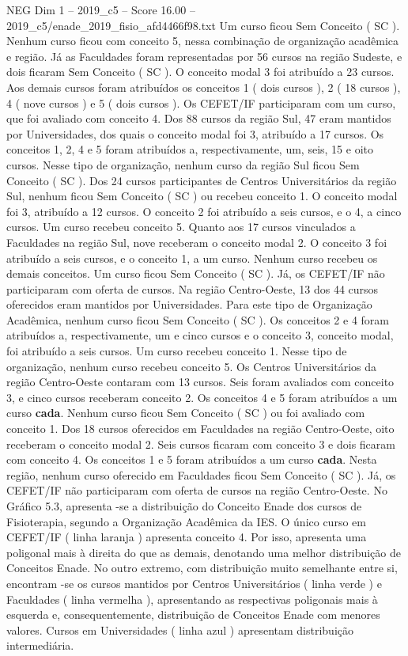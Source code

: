\begin{textsample}{NEG Dim 1 – 2019\_c5 – Score 16.00 – 2019\_c5/enade\_2019\_fisio\_afd4466f98.txt}
Um curso ficou Sem Conceito ( SC ).
Nenhum curso ficou com conceito 5, nessa combinação de organização acadêmica e região.
Já as Faculdades foram representadas por 56 cursos na região Sudeste, e dois ficaram Sem Conceito ( SC ).
O conceito modal 3 foi atribuído a 23 cursos.
Aos demais cursos foram atribuídos os conceitos 1 ( dois cursos ), 2 ( 18 cursos ), 4 ( nove cursos ) e 5 ( dois cursos ).
Os CEFET/IF participaram com um curso, que foi avaliado com conceito 4.
Dos 88 cursos da região Sul, 47 eram mantidos por Universidades, dos quais o conceito modal foi 3, atribuído a 17 cursos.
Os conceitos 1, 2, 4 e 5 foram atribuídos a, respectivamente, um, seis, 15 e oito cursos.
Nesse tipo de organização, nenhum curso da região Sul ficou Sem Conceito ( SC ).
Dos 24 cursos participantes de Centros Universitários da região Sul, nenhum ficou Sem Conceito ( SC ) ou recebeu conceito 1.
O conceito modal foi 3, atribuído a 12 cursos.
O conceito 2 foi atribuído a seis cursos, e o 4, a cinco cursos.
Um curso recebeu conceito 5.
Quanto aos 17 cursos vinculados a Faculdades na região Sul, nove receberam o conceito modal 2.
O conceito 3 foi atribuído a seis cursos, e o conceito 1, a um curso.
Nenhum curso recebeu os demais conceitos.
Um curso ficou Sem Conceito ( SC ).
Já, os CEFET/IF não participaram com oferta de cursos.
Na região Centro-Oeste, 13 dos 44 cursos oferecidos eram mantidos por Universidades.
Para este tipo de Organização Acadêmica, nenhum curso ficou Sem Conceito ( SC ).
Os conceitos 2 e 4 foram atribuídos a, respectivamente, um e cinco cursos e o conceito 3, conceito modal, foi atribuído a seis cursos.
Um curso recebeu conceito 1.
Nesse tipo de organização, nenhum curso recebeu conceito 5.
Os Centros Universitários da região Centro-Oeste contaram com 13 cursos.
Seis foram avaliados com conceito 3, e cinco cursos receberam conceito 2.
Os conceitos 4 e 5 foram atribuídos a um curso \textbf{cada}.
Nenhum curso ficou Sem Conceito ( SC ) ou foi avaliado com conceito 1.
Dos 18 cursos oferecidos em Faculdades na região Centro-Oeste, oito receberam o conceito modal 2.
Seis cursos ficaram com conceito 3 e dois ficaram com conceito 4.
Os conceitos 1 e 5 foram atribuídos a um curso \textbf{cada}.
Nesta região, nenhum curso oferecido em Faculdades ficou Sem Conceito ( SC ).
Já, os CEFET/IF não participaram com oferta de cursos na região Centro-Oeste.
No Gráfico 5.3, apresenta -se a distribuição do Conceito Enade dos cursos de Fisioterapia, segundo a Organização Acadêmica da IES.
O único curso em CEFET/IF ( linha laranja ) apresenta conceito 4.
Por isso, apresenta uma poligonal mais à direita do que as demais, denotando uma melhor distribuição de Conceitos Enade.
No outro extremo, com distribuição muito semelhante entre si, encontram -se os cursos mantidos por Centros Universitários ( linha verde ) e Faculdades ( linha vermelha ), apresentando as respectivas poligonais mais à esquerda e, consequentemente, distribuição de Conceitos Enade com menores valores.
Cursos em Universidades ( linha azul ) apresentam distribuição intermediária.

\end{textsample}
